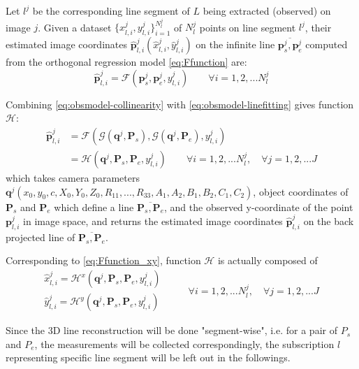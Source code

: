 Let $l^j$ be the corresponding line segment of $L$ being extracted (observed) on image $j$. Given a dataset $\{x^j_{l,i},y^j_{l,i}\}^{N^j_l}_{i=1}$ of $N^j_l$ points on line segment $l^j$, their estimated image coordinates $\hat{\mathbf{p}}^j_{l,i}(\hat{x}^j_{l,i},\hat{y}^j_{l,i})$ on the infinite line $\overline{\mathbf{p}^j_s,\mathbf{p}^j_e}$ computed from the orthogonal regression model \eqref{eq:Ffunction} are:
\begin{equation} \label{eq:obsmodel-linefitting}
\hat{\mathbf{p}}^j_{l,i} = \mathcal{F}(\mathbf{p}^j_s,\mathbf{p}^j_e,y^j_{l,i})
\qquad
\forall i=1,2,...N^j_l
\end{equation}

Combining \eqref{eq:obsmodel-collinearity} with \eqref{eq:obsmodel-linefitting} gives function $\mathcal{H}$:
\begin{equation} \label{eq:Hfunction}
\begin{split}
\hat{\mathbf{p}}^j_{l,i} &= \mathcal{F}(\mathcal{G}(\mathbf{q}^j,\mathbf{P}_s),\mathcal{G}(\mathbf{q}^j,\mathbf{P}_e),y^j_{l,i})\\
&=\mathcal{H}(\mathbf{q}^j,\mathbf{P}_s,\mathbf{P}_e,y^j_{l,i})
\qquad
\forall i=1,2,...N^j_l,\quad\forall j=1,2,...J
\end{split}
\end{equation}
which takes camera parameters $\mathbf{q}^j(x_0,y_0,c,X_0,Y_0,Z_0,R_{11},...,R_{33},A_1,A_2,B_1,B_2,C_1,C_2)$, object coordinates of $\mathbf{P}_s$ and $\mathbf{P}_e$ which define a line $\overline{\mathbf{P}_s,\mathbf{P}_e}$, and the observed y-coordinate of the point $\mathbf{p}^j_{l,i}$ in image space, and returns the estimated image coordinates $\hat{\mathbf{p}}^j_{l,i}$ on the back projected line of $\overline{\mathbf{P}_s,\mathbf{P}_e}$.

Corresponding to \cref{eq:Ffunction_xy}, function $\mathcal{H}$ is actually composed of
\begin{equation} \label{eq:Hfunction_xy}
\begin{split}
\hat{x}^j_{l,i} = \mathcal{H}^x(\mathbf{q}^j,\mathbf{P}_s,\mathbf{P}_e,y^j_{l,i})\\
\hat{y}^j_{l,i} = \mathcal{H}^y(\mathbf{q}^j,\mathbf{P}_s,\mathbf{P}_e,y^j_{l,i})
\end{split}
\qquad
\begin{split}
\forall i=1,2,...N^j_l,\quad\forall j=1,2,...J
\end{split}
\end{equation}

Since the 3D line reconstruction will be done "segment-wise", i.e. for a pair of $P_s$ and $P_e$, the measurements will be collected correspondingly, the subscription $l$ representing specific line segment will be left out in the followings.

